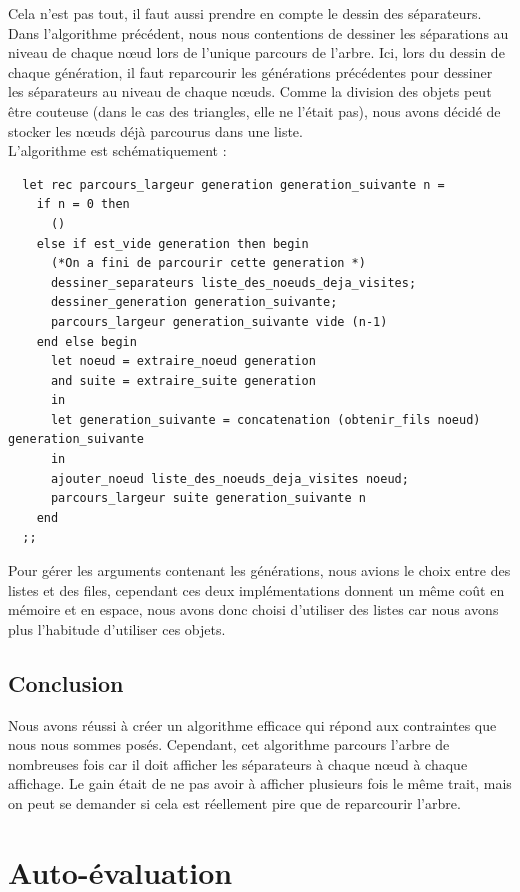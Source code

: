 \documentclass[a4paper,11pt]{article}
\begin{document}
Cela n'est pas tout, il faut aussi prendre en compte le dessin des séparateurs. Dans
l'algorithme précédent, nous nous contentions de dessiner les séparations au niveau de chaque
nœud lors de l'unique parcours de l'arbre. Ici, lors du dessin de chaque génération, il
faut reparcourir les générations précédentes pour dessiner les séparateurs au niveau de
chaque nœuds. Comme la division des objets peut être couteuse (dans le cas des triangles, elle
ne l'était pas), nous avons décidé de stocker les nœuds déjà parcourus dans une liste.\\

L'algorithme est schématiquement :

\begin{lstlisting}
  let rec parcours_largeur generation generation_suivante n =
    if n = 0 then
      ()
    else if est_vide generation then begin
      (*On a fini de parcourir cette generation *)
      dessiner_separateurs liste_des_noeuds_deja_visites;
      dessiner_generation generation_suivante;
      parcours_largeur generation_suivante vide (n-1)
    end else begin
      let noeud = extraire_noeud generation
      and suite = extraire_suite generation
      in
      let generation_suivante = concatenation (obtenir_fils noeud) generation_suivante
      in
      ajouter_noeud liste_des_noeuds_deja_visites noeud;
      parcours_largeur suite generation_suivante n
    end
  ;;
\end{lstlisting}
Pour gérer les arguments contenant les générations, nous avions le choix entre des listes et
des files, cependant ces deux implémentations donnent un même coût en mémoire et en espace,
nous avons donc choisi d'utiliser des listes car nous avons plus l'habitude d'utiliser ces
objets.\\

\subsection{Conclusion}
Nous avons réussi à créer un algorithme efficace qui répond aux contraintes que nous nous
sommes posés. Cependant, cet algorithme parcours l'arbre de nombreuses fois car il doit
afficher les séparateurs à chaque nœud à chaque affichage. Le gain était de ne pas avoir
à afficher plusieurs fois le même trait, mais on peut se demander si cela est réellement pire
que de reparcourir l'arbre.

\section{Auto-évaluation}
\end{document}
